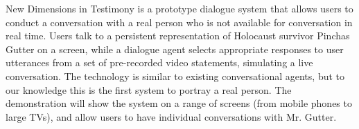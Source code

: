 New Dimensions in Testimony is a prototype dialogue system that allows users to conduct a conversation with a real person who is not available for conversation in real time. Users talk to a persistent representation of Holocaust survivor Pinchas Gutter on a screen, while a dialogue agent selects appropriate responses to user utterances from a set of pre-recorded video statements, simulating a live conversation. The technology is similar to existing conversational agents, but to our knowledge this is the first system to portray a real person. The demonstration will show the system on a range of screens (from mobile phones to large TVs), and allow users to have individual conversations with Mr. Gutter.
